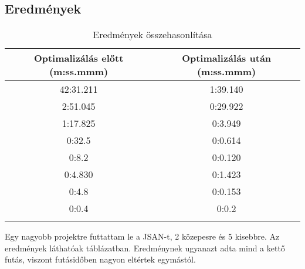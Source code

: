 \subsection{Eredmények}

\begin{table}[h!]
      \begin{center}
      \caption{Eredmények összehasonlítása}\label{tbl:Eredmenyek}
      \begin{tabular}{c c}
      \hline Optimalizálás előtt (m:ss.mmm) & Optimalizálás után (m:ss.mmm)\\
      \hline 42:31.211 & 1:39.140\\
      \hline 2:51.045& 0:29.922\\
      \hline 1:17.825& 0:3.949\\
      \hline 0:32.5& 0:0.614\\
      \hline 0:8.2 & 0:0.120\\
      \hline 0:4.830& 0:1.423\\
      \hline 0:4.8 & 0:0.153\\
      \hline 0:0.4 & 0:0.2\\
      \hline \\
      \end{tabular}
      \end{center}
\end{table}

Egy nagyobb projektre futtattam le a JSAN-t, 2 közepesre és 5 kisebbre. Az eredmények láthatóak  táblázatban.
Eredménynek ugyanazt adta mind a kettő futás, viszont futásidőben nagyon eltértek egymástól.
